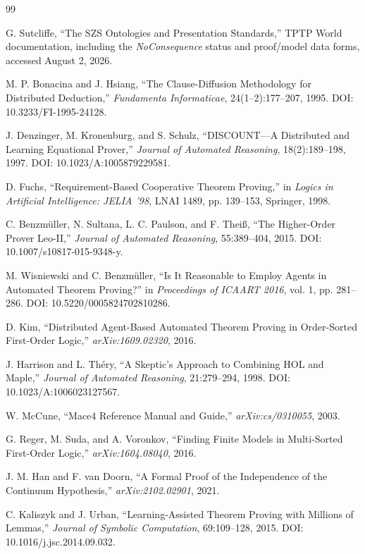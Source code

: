 \documentclass[11pt]{article}
\theoremstyle{definition}
\theoremstyle{remark}
\begin{document}
\begin{thebibliography}{99}

G. Sutcliffe,
``The SZS Ontologies and Presentation Standards,''
TPTP World documentation, including the \emph{NoConsequence} status and proof/model data forms,
accessed August 2, 2026.

M. P. Bonacina and J. Hsiang,
``The Clause-Diffusion Methodology for Distributed Deduction,''
\emph{Fundamenta Informaticae}, 24(1--2):177--207, 1995.
DOI: 10.3233/FI-1995-24128.

J. Denzinger, M. Kronenburg, and S. Schulz,
``DISCOUNT---A Distributed and Learning Equational Prover,''
\emph{Journal of Automated Reasoning}, 18(2):189--198, 1997.
DOI: 10.1023/A:1005879229581.

D. Fuchs,
``Requirement-Based Cooperative Theorem Proving,''
in \emph{Logics in Artificial Intelligence: JELIA '98}, LNAI 1489, pp. 139--153, Springer, 1998.

C. Benzm\"uller, N. Sultana, L. C. Paulson, and F. Thei\ss,
``The Higher-Order Prover Leo-II,''
\emph{Journal of Automated Reasoning}, 55:389--404, 2015.
DOI: 10.1007/s10817-015-9348-y.

M. Wisniewski and C. Benzm\"uller,
``Is It Reasonable to Employ Agents in Automated Theorem Proving?''
in \emph{Proceedings of ICAART 2016}, vol. 1, pp. 281--286.
DOI: 10.5220/0005824702810286.

D. Kim,
``Distributed Agent-Based Automated Theorem Proving in Order-Sorted First-Order Logic,''
\emph{arXiv:1609.02320}, 2016.

J. Harrison and L. Th\'ery,
``A Skeptic's Approach to Combining HOL and Maple,''
\emph{Journal of Automated Reasoning}, 21:279--294, 1998.
DOI: 10.1023/A:1006023127567.

W. McCune,
``Mace4 Reference Manual and Guide,''
\emph{arXiv:cs/0310055}, 2003.

G. Reger, M. Suda, and A. Voronkov,
``Finding Finite Models in Multi-Sorted First-Order Logic,''
\emph{arXiv:1604.08040}, 2016.

J. M. Han and F. van Doorn,
``A Formal Proof of the Independence of the Continuum Hypothesis,''
\emph{arXiv:2102.02901}, 2021.

C. Kaliszyk and J. Urban,
``Learning-Assisted Theorem Proving with Millions of Lemmas,''
\emph{Journal of Symbolic Computation}, 69:109--128, 2015.
DOI: 10.1016/j.jsc.2014.09.032.


\end{thebibliography}
\end{document}
